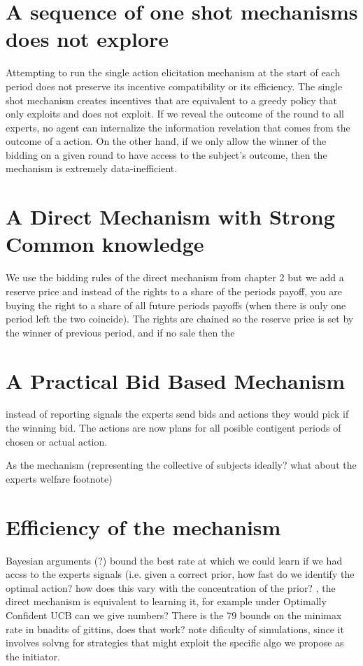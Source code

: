 \section{A sequence of one shot mechanisms does not explore}

Attempting to run the single action elicitation mechanism at the start of each period does not preserve its incentive compatibility or its efficiency.
The single shot mechanism creates incentives that are equivalent to a greedy policy that only exploits and does not exploit. If we reveal the outcome of the round to all experts,  no agent can internalize the information revelation that comes from the outcome of a action. On the other hand, if we only allow the winner of the bidding on a given round to have access to the subject's outcome, then the mechanism is extremely data-inefficient.

\section{A Direct Mechanism with Strong Common knowledge}

We use the bidding rules of the direct mechanism from chapter 2 but we add a reserve price and instead of the rights to a share of the periods payoff, you are buying the right to a share of all future periods payoffs (when there is only one period left the two coincide). The rights are chained so the reserve price is set by the winner of previous period, and if no sale then the 

\section{A Practical Bid Based Mechanism}

instead of reporting signals the experts send bids and actions they would pick if the winning bid. The actions are now plans for all posible contigent periods of chosen or actual action. 

As the mechanism (representing the collective of subjects ideally?  what about the experts welfare footnote) 




\section{Efficiency of the mechanism}



Bayesian arguments  (?)  bound the best rate at which we could learn if we had accss to the experts signals (i.e. given a correct prior, how fast do we identify the optimal action? how does this vary with the concentration of the prior? , the direct mechanism is equivalent to learning it, for example under Optimally Confident UCB can we give numbers? There is the 79 bounds on the minimax rate in bnadits of gittins, does that work? note dificulty of simulations, since it involves solvng for strategies that might exploit the specific algo we propose as the initiator.

